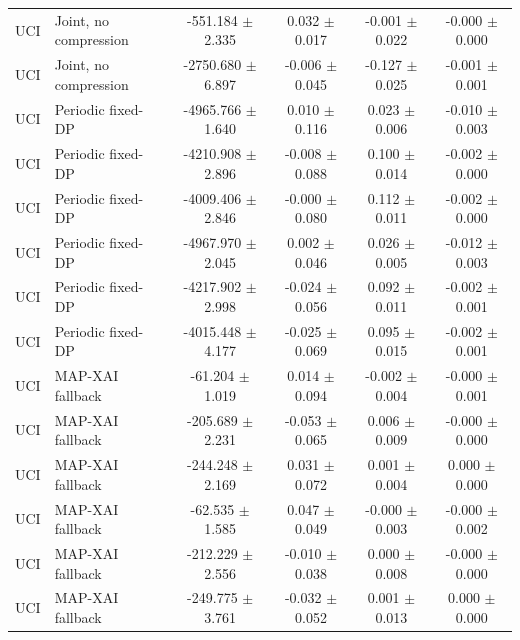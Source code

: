 \begin{tabular}{llcccc}
UCI & Joint, no compression & -551.184 $\pm$ 2.335 & 0.032 $\pm$ 0.017 & -0.001 $\pm$ 0.022 & -0.000 $\pm$ 0.000 \\
UCI & Joint, no compression & -2750.680 $\pm$ 6.897 & -0.006 $\pm$ 0.045 & -0.127 $\pm$ 0.025 & -0.001 $\pm$ 0.001 \\
UCI & Periodic fixed-DP & -4965.766 $\pm$ 1.640 & 0.010 $\pm$ 0.116 & 0.023 $\pm$ 0.006 & -0.010 $\pm$ 0.003 \\
UCI & Periodic fixed-DP & -4210.908 $\pm$ 2.896 & -0.008 $\pm$ 0.088 & 0.100 $\pm$ 0.014 & -0.002 $\pm$ 0.000 \\
UCI & Periodic fixed-DP & -4009.406 $\pm$ 2.846 & -0.000 $\pm$ 0.080 & 0.112 $\pm$ 0.011 & -0.002 $\pm$ 0.000 \\
UCI & Periodic fixed-DP & -4967.970 $\pm$ 2.045 & 0.002 $\pm$ 0.046 & 0.026 $\pm$ 0.005 & -0.012 $\pm$ 0.003 \\
UCI & Periodic fixed-DP & -4217.902 $\pm$ 2.998 & -0.024 $\pm$ 0.056 & 0.092 $\pm$ 0.011 & -0.002 $\pm$ 0.001 \\
UCI & Periodic fixed-DP & -4015.448 $\pm$ 4.177 & -0.025 $\pm$ 0.069 & 0.095 $\pm$ 0.015 & -0.002 $\pm$ 0.001 \\
UCI & MAP-XAI fallback & -61.204 $\pm$ 1.019 & 0.014 $\pm$ 0.094 & -0.002 $\pm$ 0.004 & -0.000 $\pm$ 0.001 \\
UCI & MAP-XAI fallback & -205.689 $\pm$ 2.231 & -0.053 $\pm$ 0.065 & 0.006 $\pm$ 0.009 & -0.000 $\pm$ 0.000 \\
UCI & MAP-XAI fallback & -244.248 $\pm$ 2.169 & 0.031 $\pm$ 0.072 & 0.001 $\pm$ 0.004 & 0.000 $\pm$ 0.000 \\
UCI & MAP-XAI fallback & -62.535 $\pm$ 1.585 & 0.047 $\pm$ 0.049 & -0.000 $\pm$ 0.003 & -0.000 $\pm$ 0.002 \\
UCI & MAP-XAI fallback & -212.229 $\pm$ 2.556 & -0.010 $\pm$ 0.038 & 0.000 $\pm$ 0.008 & -0.000 $\pm$ 0.000 \\
UCI & MAP-XAI fallback & -249.775 $\pm$ 3.761 & -0.032 $\pm$ 0.052 & 0.001 $\pm$ 0.013 & 0.000 $\pm$ 0.000 \\
\bottomrule
\end{tabular}
